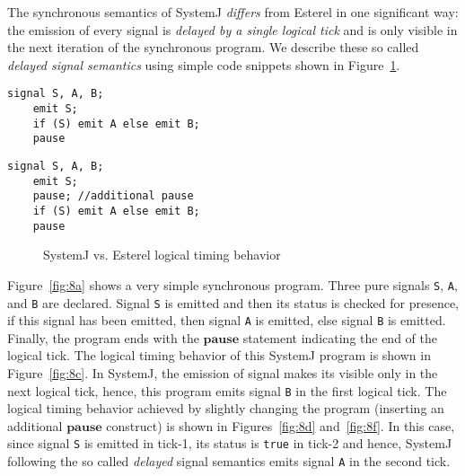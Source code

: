 \documentclass[10pt,journal,cspaper,compsoc]{IEEEtran}
\begin{document}
The synchronous semantics of SystemJ \textit{differs} from Esterel in
one significant way: the emission of every signal is \textit{delayed by
  a single logical tick} and is only visible in the next iteration of
the synchronous program. We describe these so called \textit{delayed
  signal semantics} using simple code snippets shown in
Figure~\ref{fig:8}.

\newbox{\csf}
\begin{lrbox}{\csf}
  \begin{lstlisting}[style=sysj,morekeywords={signal,loop,abort,await,emit,present,trap,pause,exit,delay,suspend}]
    signal S, A, B;
    emit S; 
    if (S) emit A else emit B;
    pause
  \end{lstlisting}
\end{lrbox}

\newbox{\css}
\begin{lrbox}{\css}
  \begin{lstlisting}[style=sysj,morekeywords={signal,loop,abort,await,emit,present,trap,pause,exit,delay,suspend}]
    signal S, A, B;
    emit S; 
    pause; //additional pause 
    if (S) emit A else emit B;
    pause
  \end{lstlisting}
\end{lrbox}

\begin{figure}[t!]
  \centering
\hspace{30pt}

\hspace{30pt}
  \caption{SystemJ vs. Esterel logical timing behavior}
  \label{fig:8}
\end{figure}

Figure~\ref{fig:8a} shows a very simple synchronous program. Three pure
signals \texttt{S}, \texttt{A}, and \texttt{B} are declared. Signal
\texttt{S} is emitted and then its status is checked for presence, if
this signal has been emitted, then signal \texttt{A} is emitted, else
signal \texttt{B} is emitted. Finally, the program ends with the
$\mathbf{pause}$ statement indicating the end of the logical tick. The
logical timing behavior of this SystemJ program is shown in
Figure~\ref{fig:8c}. In SystemJ, the emission of signal makes its
visible only in the next logical tick, hence, this program emits signal
\texttt{B} in the first logical tick. The logical timing behavior
achieved by slightly changing the program (inserting an additional
$\mathbf{pause}$ construct) is shown in Figures~\ref{fig:8d}
and~\ref{fig:8f}. In this case, since signal \texttt{S} is emitted in
tick-1, its status is \texttt{true} in tick-2 and hence, SystemJ
following the so called \textit{delayed} signal semantics emits signal
\texttt{A} in the second tick.
\end{document}
